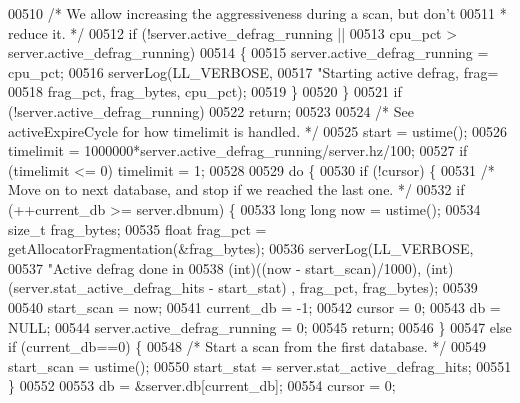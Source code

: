 \begin{DoxyCode}
00510          \textcolor{comment}{/* We allow increasing the aggressiveness during a scan, but don't}
00511 \textcolor{comment}{          * reduce it. */}
00512         \textcolor{keywordflow}{if} (!server.active\_defrag\_running ||
00513             cpu\_pct > server.active\_defrag\_running)
00514         \{
00515             server.active\_defrag\_running = cpu\_pct;
00516             serverLog(LL\_VERBOSE,
00517                 \textcolor{stringliteral}{"Starting active defrag, frag=%
00518                 frag\_pct, frag\_bytes, cpu\_pct);
00519         \}
00520     \}
00521     \textcolor{keywordflow}{if} (!server.active\_defrag\_running)
00522         \textcolor{keywordflow}{return};
00523 
00524     \textcolor{comment}{/* See activeExpireCycle for how timelimit is handled. */}
00525     start = ustime();
00526     timelimit = 1000000*server.active\_defrag\_running/server.hz/100;
00527     \textcolor{keywordflow}{if} (timelimit <= 0) timelimit = 1;
00528 
00529     \textcolor{keywordflow}{do} \{
00530         \textcolor{keywordflow}{if} (!cursor) \{
00531             \textcolor{comment}{/* Move on to next database, and stop if we reached the last one. */}
00532             \textcolor{keywordflow}{if} (++current\_db >= server.dbnum) \{
00533                 \textcolor{keywordtype}{long} \textcolor{keywordtype}{long} now = ustime();
00534                 size\_t frag\_bytes;
00535                 \textcolor{keywordtype}{float} frag\_pct = getAllocatorFragmentation(&frag\_bytes);
00536                 serverLog(LL\_VERBOSE,
00537                     \textcolor{stringliteral}{"Active defrag done in %
00538                     (\textcolor{keywordtype}{int})((now - start\_scan)/1000), (\textcolor{keywordtype}{int})(server.stat\_active\_defrag\_hits - start\_stat)
      , frag\_pct, frag\_bytes);
00539 
00540                 start\_scan = now;
00541                 current\_db = -1;
00542                 cursor = 0;
00543                 db = NULL;
00544                 server.active\_defrag\_running = 0;
00545                 \textcolor{keywordflow}{return};
00546             \}
00547             \textcolor{keywordflow}{else} \textcolor{keywordflow}{if} (current\_db==0) \{
00548                 \textcolor{comment}{/* Start a scan from the first database. */}
00549                 start\_scan = ustime();
00550                 start\_stat = server.stat\_active\_defrag\_hits;
00551             \}
00552 
00553             db = &server.db[current\_db];
00554             cursor = 0;
}}
\end{DoxyCode}
